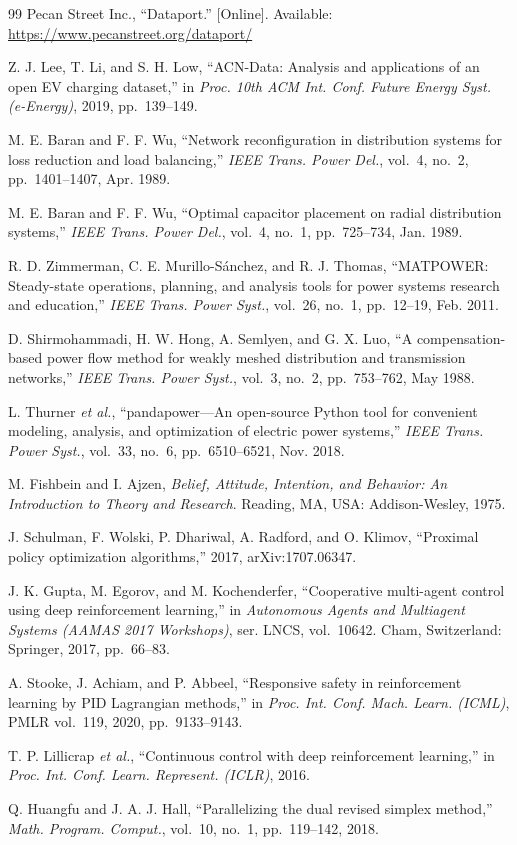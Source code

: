 \begin{thebibliography}{99}
 Pecan Street Inc., ``Dataport.'' [Online]. Available: \url{https://www.pecanstreet.org/dataport/}

 Z. J. Lee, T. Li, and S. H. Low, ``ACN-Data: Analysis and applications of an open EV charging dataset,'' in \emph{Proc. 10th ACM Int. Conf. Future Energy Syst. (e-Energy)}, 2019, pp.~139--149.

 M. E. Baran and F. F. Wu, ``Network reconfiguration in distribution systems for loss reduction and load balancing,'' \emph{IEEE Trans. Power Del.}, vol.~4, no.~2, pp.~1401--1407, Apr. 1989.

 M. E. Baran and F. F. Wu, ``Optimal capacitor placement on radial distribution systems,'' \emph{IEEE Trans. Power Del.}, vol.~4, no.~1, pp.~725--734, Jan. 1989.

 R. D. Zimmerman, C. E. Murillo-S{\'a}nchez, and R. J. Thomas, ``MATPOWER: Steady-state operations, planning, and analysis tools for power systems research and education,'' \emph{IEEE Trans. Power Syst.}, vol.~26, no.~1, pp.~12--19, Feb. 2011.

 D. Shirmohammadi, H. W. Hong, A. Semlyen, and G. X. Luo, ``A compensation-based power flow method for weakly meshed distribution and transmission networks,'' \emph{IEEE Trans. Power Syst.}, vol.~3, no.~2, pp.~753--762, May 1988.

 L. Thurner \emph{et al.}, ``pandapower---An open-source Python tool for convenient modeling, analysis, and optimization of electric power systems,'' \emph{IEEE Trans. Power Syst.}, vol.~33, no.~6, pp.~6510--6521, Nov. 2018.

 M. Fishbein and I. Ajzen, \emph{Belief, Attitude, Intention, and Behavior: An Introduction to Theory and Research}. Reading, MA, USA: Addison-Wesley, 1975.

 J. Schulman, F. Wolski, P. Dhariwal, A. Radford, and O. Klimov, ``Proximal policy optimization algorithms,'' 2017, arXiv:1707.06347.

 J. K. Gupta, M. Egorov, and M. Kochenderfer, ``Cooperative multi-agent control using deep reinforcement learning,'' in \emph{Autonomous Agents and Multiagent Systems (AAMAS 2017 Workshops)}, ser. LNCS, vol.~10642. Cham, Switzerland: Springer, 2017, pp.~66--83.

 A. Stooke, J. Achiam, and P. Abbeel, ``Responsive safety in reinforcement learning by PID Lagrangian methods,'' in \emph{Proc. Int. Conf. Mach. Learn. (ICML)}, PMLR vol.~119, 2020, pp.~9133--9143.

 T. P. Lillicrap \emph{et al.}, ``Continuous control with deep reinforcement learning,'' in \emph{Proc. Int. Conf. Learn. Represent. (ICLR)}, 2016.

 Q. Huangfu and J. A. J. Hall, ``Parallelizing the dual revised simplex method,'' \emph{Math. Program. Comput.}, vol.~10, no.~1, pp.~119--142, 2018.

\end{thebibliography}
